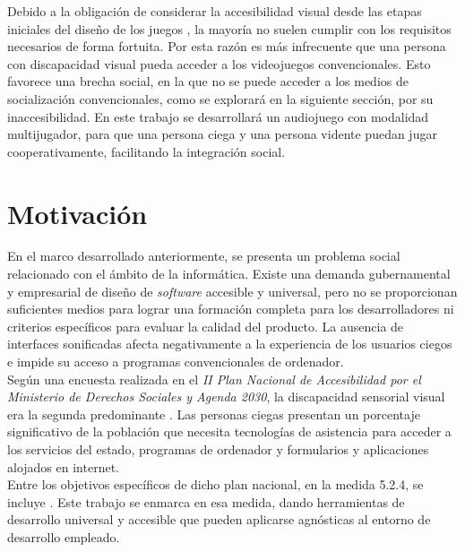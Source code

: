   Debido a la obligación de considerar la accesibilidad visual desde las etapas iniciales del diseño de los juegos \cite{LibroBlancoAccesibilidad}, la mayoría no suelen cumplir con los requisitos necesarios de forma fortuita. Por esta razón es más infrecuente que una persona con discapacidad visual pueda acceder a los videojuegos convencionales. Esto favorece una brecha social, en la que no se puede acceder a los medios de socialización convencionales, como se explorará en la siguiente sección, por su inaccesibilidad. En este trabajo se desarrollará un audiojuego con modalidad multijugador, para que una persona ciega y una persona vidente puedan jugar cooperativamente, facilitando la integración social.\\
  

\section{Motivación}
En el marco desarrollado anteriormente, se presenta un problema social relacionado con el ámbito de la informática. Existe una demanda gubernamental y empresarial de diseño de \textit{software} accesible y universal, pero no se proporcionan suficientes medios para lograr una formación completa para los desarrolladores ni criterios específicos para evaluar la calidad del producto. La ausencia de interfaces sonificadas afecta negativamente a la experiencia de los usuarios ciegos e impide su acceso a programas convencionales de ordenador. \\

Según una encuesta realizada en el \textit{II Plan Nacional de Accesibilidad por el Ministerio de Derechos Sociales y Agenda 2030}, la discapacidad sensorial visual era la segunda predominante \cite[p ~54]{plan-nacional-accesibilidad-2023}. Las personas ciegas presentan un porcentaje significativo de la población que necesita tecnologías de asistencia para acceder a los servicios del estado, programas de ordenador y formularios y aplicaciones alojados en internet.\\

Entre los objetivos específicos de dicho plan nacional, en la medida 5.2.4, se incluye  \cite[p ~42]{plan-nacional-accesibilidad-2023}. Este trabajo se enmarca en esa medida, dando herramientas de desarrollo universal y accesible que pueden aplicarse agnósticas al entorno de desarrollo empleado.\\

